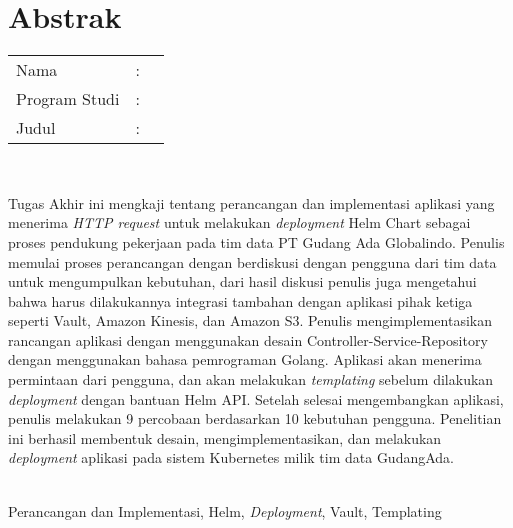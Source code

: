 %
%
%

\chapter*{Abstrak}
\singlespacing

\vspace*{0.2cm}

\noindent \begin{tabular}{l l p{10cm}}
	Nama&: & \penulis \\
	Program Studi&: & \program \\
	Judul&: & \judul \\
\end{tabular} \\

\vspace*{0.5cm}

\noindent Tugas Akhir ini mengkaji tentang perancangan dan implementasi aplikasi yang menerima \textit{HTTP request} untuk melakukan \textit{deployment} Helm Chart sebagai proses pendukung pekerjaan pada tim data PT Gudang Ada Globalindo. Penulis memulai proses perancangan dengan berdiskusi dengan pengguna dari tim data untuk mengumpulkan kebutuhan, dari  hasil diskusi penulis juga mengetahui bahwa harus dilakukannya integrasi tambahan dengan aplikasi pihak ketiga seperti Vault, Amazon Kinesis, dan Amazon S3. Penulis mengimplementasikan rancangan aplikasi dengan menggunakan desain Controller-Service-Repository dengan menggunakan bahasa pemrograman Golang. Aplikasi akan menerima permintaan dari pengguna, dan akan melakukan \textit{templating} sebelum dilakukan \textit{deployment} dengan bantuan Helm API. Setelah selesai mengembangkan aplikasi, penulis melakukan 9 percobaan berdasarkan 10 kebutuhan  pengguna. Penelitian ini berhasil membentuk desain, mengimplementasikan, dan melakukan \textit{deployment} aplikasi pada sistem Kubernetes milik tim data GudangAda.\\

\vspace*{0.2cm}

\noindent {} \\ Perancangan dan Implementasi, Helm, \textit{Deployment}, Vault, Templating \\

\onehalfspacing
\newpage
